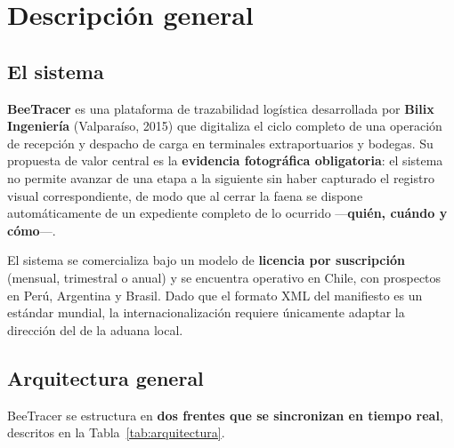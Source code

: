 \chapter{Descripción general}
\label{cap:descripcion}

\section{El sistema}
\label{sec:elsistema}

\textbf{BeeTracer} es una plataforma de trazabilidad logística desarrollada por \textbf{Bilix
Ingeniería} (Valparaíso, 2015) que digitaliza el ciclo completo de una operación de recepción y
despacho de carga en terminales extraportuarios y bodegas. Su propuesta de valor central es la
\textbf{evidencia fotográfica obligatoria}: el sistema no permite avanzar de una etapa a la
siguiente sin haber capturado el registro visual correspondiente, de modo que al cerrar la faena se
dispone automáticamente de un expediente completo de lo ocurrido ---\textbf{quién, cuándo y
cómo}---.

El sistema se comercializa bajo un modelo de \textbf{licencia por suscripción} (mensual,
trimestral o anual) y se encuentra operativo en Chile, con prospectos en Perú, Argentina y Brasil.
Dado que el formato XML del manifiesto es un estándar mundial, la internacionalización requiere
únicamente adaptar la dirección del  de la aduana local.

\section{Arquitectura general}
\label{sec:arquitectura}

BeeTracer se estructura en \textbf{dos frentes que se sincronizan en tiempo real}, descritos en la
Tabla~\ref{tab:arquitectura}.

